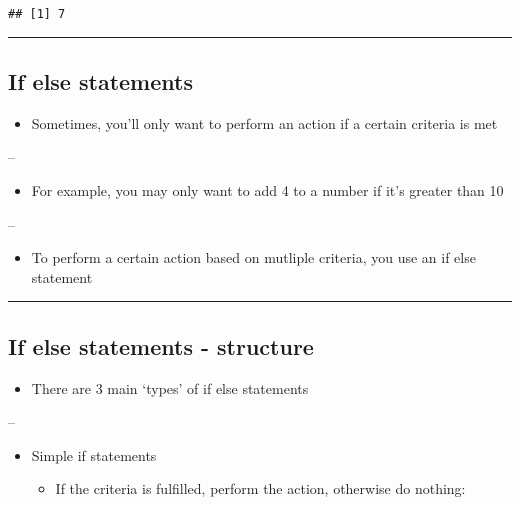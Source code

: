 \documentclass[]{article}
\providecommand{\tightlist}{%
  \setlength{\itemsep}{0pt}\setlength{\parskip}{0pt}}
\begin{document}
\begin{verbatim}
## [1] 7
\end{verbatim}

\begin{center}\rule{0.5\linewidth}{\linethickness}\end{center}

\hypertarget{if-else-statements}{%
\subsection{If else statements}\label{if-else-statements}}

\begin{itemize}
\tightlist
\item
  Sometimes, you'll only want to perform an action if a certain criteria
  is met
\end{itemize}

--

\begin{itemize}
\tightlist
\item
  For example, you may only want to add 4 to a number if it's greater
  than 10
\end{itemize}

--

\begin{itemize}
\tightlist
\item
  To perform a certain action based on mutliple criteria, you use an if
  else statement
\end{itemize}

\begin{center}\rule{0.5\linewidth}{\linethickness}\end{center}

\hypertarget{if-else-statements---structure}{%
\subsection{If else statements -
structure}\label{if-else-statements---structure}}

\begin{itemize}
\tightlist
\item
  There are 3 main `types' of if else statements
\end{itemize}

--

\begin{itemize}
\tightlist
\item
  Simple if statements

  \begin{itemize}
  \tightlist
  \item
    If the criteria is fulfilled, perform the action, otherwise do
    nothing:
  \end{itemize}
\end{itemize}
\end{document}
